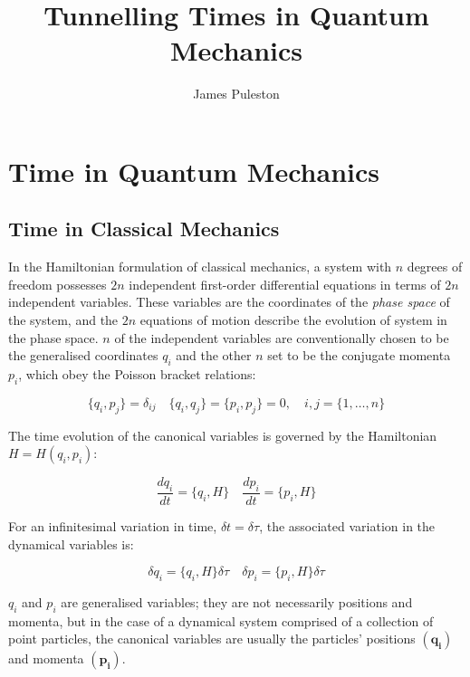 \documentclass{article}
\title{Tunnelling Times in Quantum Mechanics}
\author{James Puleston}
\begin{document}
\maketitle

\section{Time in Quantum Mechanics}

\subsection{Time in Classical Mechanics}
In the Hamiltonian formulation of classical mechanics, a system with $n$ degrees of freedom possesses $2n$ independent first-order differential equations in terms of $2n$ independent variables. These variables are the coordinates of the \textit{phase space} of the system, and the $2n$ equations of motion describe the evolution of system in the phase space. $n$ of the independent variables are conventionally chosen to be the generalised coordinates $q_i$ and the other $n$ set to be the conjugate momenta $p_i$, which obey the Poisson bracket relations: \cite{Goldstein}

\begin{equation}
	\{q_i, p_j\}=\delta_{ij} \quad \{q_i, q_j\}=\{p_i,p_j\}=0, \quad i,j=\{1,\dots,n\}
	\label{conjugatevars}
\end{equation}

\noindent The time evolution of the canonical variables is governed by the Hamiltonian $H = H(q_i, p_i)$:

\begin{equation}
	\frac{dq_i}{dt} = \{q_i, H\} \quad \frac{dp_i}{dt} = \{p_i, H\}
	\label{timeevolution}
\end{equation}

\noindent For an infinitesimal variation in time, $\delta t = \delta \tau$, the associated variation in the dynamical variables is:

\begin{equation}
	\delta q_i = \{q_i, H\}\delta\tau \quad \delta p_i = \{p_i, H\}\delta\tau
	\label{timetranslation}
\end{equation}

\noindent $q_i$ and $p_i$ are generalised variables; they are not necessarily positions and momenta, but in the case of a dynamical system comprised of a collection of point particles, the canonical variables are usually the particles' positions $(\boldsymbol{q_i})$ and momenta $(\boldsymbol{p_i})$. 
\end{document}
